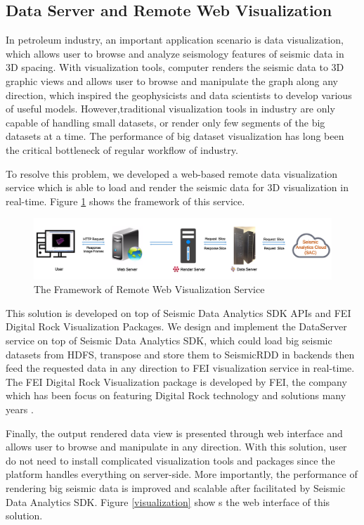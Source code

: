 \subsection{Data Server and Remote Web Visualization}

In petroleum industry, an important application scenario is data visualization, which allows user to browse and analyze seismology features of seismic data in 3D spacing. With visualization tools, computer renders the seismic data to 3D graphic views and allows user to browse and manipulate the graph along any direction, which inspired the geophysicists and data scientists to develop various of useful models. However,traditional visualization tools in industry are only capable of handling small datasets, or render only few segments of the big datasets at a time. The performance of  big dataset visualization has long been the critical bottleneck of regular workflow of industry.

To resolve this problem, we developed a web-based remote data visualization service which is able to load and render the seismic data for 3D visualization in real-time. Figure \ref{visualization_framework} shows the framework of this service. 

\begin{figure}[h]
\centering
\includegraphics[scale=0.3]{figures/visualization_framework.png}
\caption{The Framework of Remote Web Visualization Service}
\label{visualization_framework}
\end{figure}

This solution is developed on top of Seismic Data Analytics SDK APIs and FEI Digital Rock Visualization Packages. We design and implement the DataServer service on top of Seismic Data Analytics SDK, which could load big seismic datasets from HDFS, transpose and store them to SeismicRDD in backends then feed the requested data in any direction to FEI visualization service in real-time. The FEI Digital Rock Visualization package is developed by FEI, the company which has been focus on featuring Digital Rock technology and solutions many years \cite{FEICompany}. 

Finally, the output rendered data view is presented through web interface and allows user to browse and manipulate in any direction. With this solution, user do not need to install complicated visualization tools and packages since the platform handles everything on server-side. More importantly, the performance of rendering big seismic data is improved and scalable after facilitated by Seismic Data Analytics SDK. Figure \ref{visualization} show s the web interface of this solution.

